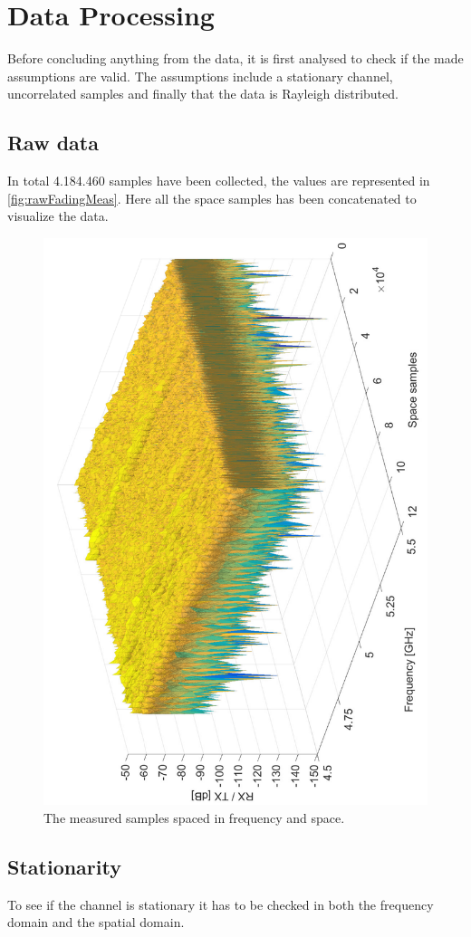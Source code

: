 \section{Data Processing}

Before concluding anything from the data, it is first analysed to check if the made assumptions are valid. The assumptions include a stationary channel, uncorrelated samples and finally that the data is Rayleigh distributed.

\subsection{Raw data}

In total 4.184.460 samples have been collected, the values are represented in \autoref{fig:rawFadingMeas}. Here all the space samples has been concatenated to visualize the data.

\begin{figure}[H]
\centering
\includegraphics[height = \textwidth, angle = -90]{figures/rawFadingMeas.pdf}
\caption{The measured samples spaced in frequency and space.}
\label{fig:rawFadingMeas}
\end{figure}


\subsection{Stationarity}
To see if the channel is stationary it has to be checked in both the frequency domain and the spatial domain. 

